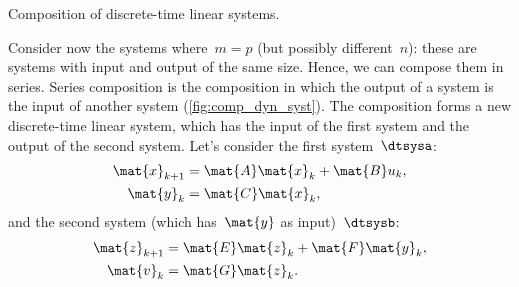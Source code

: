 \begin{marginfigure}
    \centering
    \caption{Composition of discrete-time linear systems.}
    \label{fig:comp_dyn_syst}
\end{marginfigure}

Consider now the systems where~$m=p$ (but possibly different~$n$):
these are systems with input and output of the same size.
Hence, we can compose them in series.
Series composition is the composition in which the output of a system is the input of another system (\cref{fig:comp_dyn_syst}).
The composition forms a new discrete-time linear system, which has the input of the first system and the output of the second system.
Let's consider the first system~$\dtsysa$:
\begin{equation*}
    \label{eq:dlin-1}
    \begin{aligned}
        \mat{x}_{k+1} &= \mat{A} \mat{x}_k + \mat{B} u_k, \\
        \mat{y}_{k}   &= \mat{C} \mat{x}_k,
    \end{aligned}
\end{equation*}
and the second system (which has~$\mat{y}$ as input)~$\dtsysb$:
\begin{equation*}
    \label{eq:dlin-2}
    \begin{aligned}
        \mat{z}_{k+1} &= \mat{E} \mat{z}_k + \mat{F} \mat{y}_k, \\
        \mat{v}_{k}   &= \mat{G} \mat{z}_k.
    \end{aligned}
\end{equation*}

